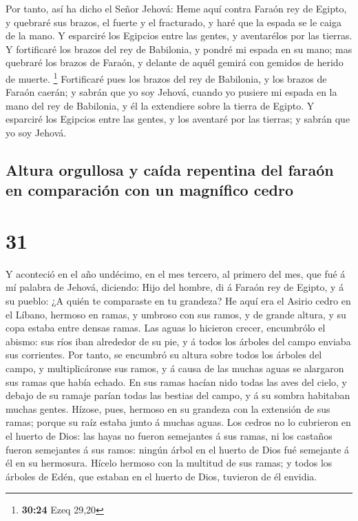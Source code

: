  Por tanto, así ha dicho el Señor Jehová: Heme aquí
contra Faraón rey de Egipto, y quebraré sus brazos, el fuerte y el
fracturado, y haré que la espada se le caiga de la mano. 
Y esparciré los Egipcios entre las gentes, y aventarélos por las
tierras.  Y fortificaré los brazos del rey de Babilonia,
y pondré mi espada en su mano; mas quebraré los brazos de Faraón, y
delante de aquél gemirá con gemidos de herido de muerte. \footnote{\textbf{30:24}
  Ezeq 29,20}  Fortificaré pues los brazos del rey de
Babilonia, y los brazos de Faraón caerán; y sabrán que yo soy Jehová,
cuando yo pusiere mi espada en la mano del rey de Babilonia, y él la
extendiere sobre la tierra de Egipto.  Y esparciré los
Egipcios entre las gentes, y los aventaré por las tierras; y sabrán que
yo soy Jehová.

\hypertarget{altura-orgullosa-y-cauxedda-repentina-del-farauxf3n-en-comparaciuxf3n-con-un-magnuxedfico-cedro}{%
\subsection{Altura orgullosa y caída repentina del faraón en comparación
con un magnífico
cedro}\label{altura-orgullosa-y-cauxedda-repentina-del-farauxf3n-en-comparaciuxf3n-con-un-magnuxedfico-cedro}}

\hypertarget{section-30}{%
\section{31}\label{section-30}}

 Y aconteció en el año undécimo, en el mes tercero, al
primero del mes, que fué á mí palabra de Jehová, diciendo:
 Hijo del hombre, di á Faraón rey de Egipto, y á su
pueblo: ¿A quién te comparaste en tu grandeza?  He aquí
era el Asirio cedro en el Líbano, hermoso en ramas, y umbroso con sus
ramos, y de grande altura, y su copa estaba entre densas ramas.
 Las aguas lo hicieron crecer, encumbrólo el abismo: sus
ríos iban alrededor de su pie, y á todos los árboles del campo enviaba
sus corrientes.  Por tanto, se encumbró su altura sobre
todos los árboles del campo, y multiplicáronse sus ramos, y á causa de
las muchas aguas se alargaron sus ramas que había echado. 
En sus ramas hacían nido todas las aves del cielo, y debajo de su ramaje
parían todas las bestias del campo, y á su sombra habitaban muchas
gentes.  Hízose, pues, hermoso en su grandeza con la
extensión de sus ramas; porque su raíz estaba junto á muchas aguas.
 Los cedros no lo cubrieron en el huerto de Dios: las
hayas no fueron semejantes á sus ramas, ni los castaños fueron
semejantes á sus ramos: ningún árbol en el huerto de Dios fué semejante
á él en su hermosura.  Hícelo hermoso con la multitud de
sus ramas; y todos los árboles de Edén, que estaban en el huerto de
Dios, tuvieron de él envidia.

